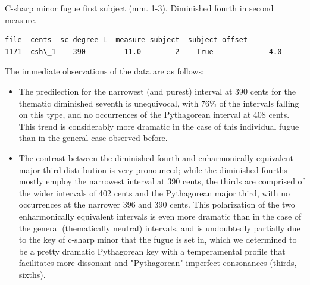 \begin{Example}[H]
    \begin{center}
    \caption[Diminished fourth in c-sharp minor fugue first subject (mm. 1-3). ]{ C-sharp minor fugue first subject (mm. 1-3). Diminished fourth in second measure.}
    \end{center}
\end{Example}
    
\begin{Verbatim}[commandchars=\\\{\}]
       file  cents  sc degree L  measure subject  subject offset
1171  csh\_1    390         11.0        2    True             4.0
\end{Verbatim}

    \begin{center}
    \end{center}
    
    The immediate observations of the data are as follows:

\begin{itemize}
\tightlist
\item
  The predilection for the narrowest (and purest) interval at 390 cents
  for the thematic diminished seventh is unequivocal, with 76\% of the
  intervals falling on this type, and no occurrences of the Pythagorean
  interval at 408 cents. This trend is considerably more dramatic in the
  case of this individual fugue than in the general case observed
  before.
\item
  The contrast between the diminished fourth and enharmonically
  equivalent major third distribution is very pronounced; while the
  diminished fourths mostly employ the narrowest interval at 390 cents,
  the thirds are comprised of the wider intervals of 402 cents and the
  Pythagorean major third, with no occurrences at the narrower 396 and
  390 cents. This polarization of the two enharmonically equivalent
  intervals is even more dramatic than in the case of the general
  (thematically neutral) intervals, and is undoubtedly partially due to
  the key of c-sharp minor that the fugue is set in, which we determined
  to be a pretty dramatic Pythagorean key with a temperamental profile
  that facilitates more dissonant and "Pythagorean" imperfect
  consonances (thirds, sixths).
\end{itemize}

